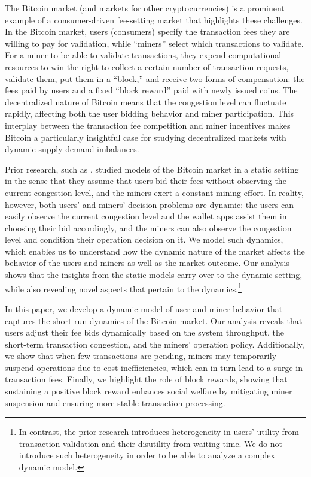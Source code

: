 \documentclass[12pt, letterpaper]{article}
\begin{document}
The Bitcoin market (and markets for other cryptocurrencies) is a prominent example of a consumer-driven fee-setting market that highlights these challenges. In the Bitcoin market, users (consumers) specify the transaction fees they are willing to pay for validation, while ``miners'' select which transactions to validate. For a miner to be able to validate transactions, they expend computational resources to win the right to collect a certain number of transaction requests, validate them, put them in a ``block,'' and receive two forms of compensation: the fees paid by users and a fixed ``block reward'' paid with newly issued coins. The decentralized nature of Bitcoin means that the congestion level can fluctuate rapidly, affecting both the user bidding behavior and miner participation. This interplay between the transaction fee competition and miner incentives makes Bitcoin a particularly insightful case for studying decentralized markets with dynamic supply-demand imbalances.

Prior research, such as \citet{easley2019mining,huberman2021monopoly,hinzen2022bitcoin,john2025proof}, studied models of the Bitcoin market in a static setting in the sense that they assume that users bid their fees without observing the current congestion level, and the miners exert a constant mining effort. In reality, however, both users' and miners' decision problems are dynamic: the users can easily observe the current congestion level and the wallet apps assist them in choosing their bid accordingly, and the miners can also observe the congestion level and condition their operation decision on it. We model such dynamics,  which enables us to understand how the dynamic nature of the market affects the behavior of the users and miners as well as the market outcome. Our analysis shows that the insights from the static models carry over to the dynamic setting, while also revealing novel aspects that pertain to the dynamics.\footnote{In contrast, the prior research introduces heterogeneity in users' utility from transaction validation and their disutility from waiting time. We do not introduce such heterogeneity in order to be able to analyze a complex dynamic model.} 


In this paper, we develop a dynamic model of user and miner behavior that captures the short-run dynamics of the Bitcoin market. Our analysis reveals that users adjust their fee bids dynamically based on the system throughput, the short-term transaction congestion, and the miners' operation policy. Additionally, we show that when few transactions are pending, miners may temporarily suspend operations due to cost inefficiencies, which can in turn lead to a surge in transaction fees. Finally, we highlight the role of block rewards, showing that sustaining a positive block reward enhances social welfare by mitigating miner suspension and ensuring more stable transaction processing.
\end{document}
